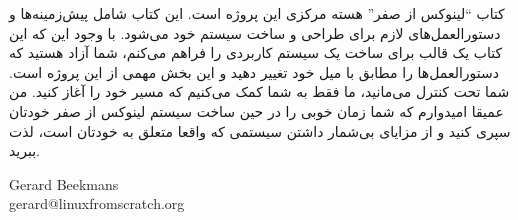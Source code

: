 \documentclass{book}
\begin{document}
\newline
\newline
کتاب “لینوکس از صفر” هسته مرکزی این پروژه است. این کتاب شامل پیش‌زمینه‌ها و دستورالعمل‌های لازم برای طراحی و ساخت سیستم خود می‌شود. با وجود این که این کتاب یک قالب برای ساخت یک سیستم کاربردی را فراهم می‌کنم، شما آزاد هستید که دستورالعمل‌ها را مطابق با میل خود تغییر دهید و این بخش مهمی از این پروژه است. شما تحت کنترل می‌مانید، ما فقط به شما کمک می‌کنیم که مسیر خود را آغاز کنید.
\newline
\newline
من عمیقا امیدوارم که شما زمان خوبی را در حین ساخت سیستم لینوکس از صفر خودتان سپری کنید و از مزایای بی‌شمار داشتن 
سیستمی که واقعا متعلق به خودتان است، لذت ببرید.
\newline
\newline
\begin{flushleft}
Gerard Beekmans \\
gerard@linuxfromscratch.org
\end{flushleft}
\end{document}
